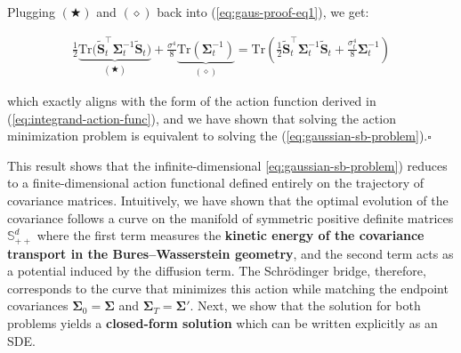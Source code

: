 \documentclass{article}
\begin{document}
Plugging $(\bigstar)$ and $(\diamond)$ back into (\ref{eq:gaus-proof-eq1}), we get:
\begin{small}
\begin{align}
    \frac{1}{2}\underbrace{\text{Tr}\big(\tilde{\boldsymbol{S}}^\top_t\boldsymbol{\Sigma}^{-1}_t\tilde{\boldsymbol{S}}_t\big)}_{(\bigstar)}+\frac{\sigma^4}{8}\underbrace{\text{Tr}(\boldsymbol{\Sigma}_t^{-1})}_{(\diamond)}=\text{Tr}\left(\frac{1}{2}\tilde{\boldsymbol{S}}^\top_t\boldsymbol{\Sigma}^{-1}_t\tilde{\boldsymbol{S}}_t+\frac{\sigma_t^4}{8}\boldsymbol{\Sigma}_t^{-1}\right)
\end{align}
\end{small}
which exactly aligns with the form of the action function derived in (\ref{eq:integrand-action-func}), and we have shown that solving the action minimization problem is equivalent to solving the (\ref{eq:gaussian-sb-problem}).\hfill $\square$

This result shows that the infinite-dimensional \ref{eq:gaussian-sb-problem}) reduces to a finite-dimensional action functional defined entirely on the trajectory of covariance matrices. Intuitively, we have shown that the optimal evolution of the covariance follows a curve on the manifold of symmetric positive definite matrices $\mathbb{S}_{++}^d$ where the first term measures the \textbf{kinetic energy of the covariance transport in the Bures–Wasserstein geometry}, and the second term acts as a potential induced by the diffusion term. The Schrödinger bridge, therefore, corresponds to the curve that minimizes this action while matching the endpoint covariances $\boldsymbol{\Sigma}_0=\boldsymbol{\Sigma}$ and $\boldsymbol{\Sigma}_T=\boldsymbol{\Sigma}'$. Next, we show that the solution for both problems yields a \textbf{closed-form solution} which can be written explicitly as an SDE.
\end{document}
